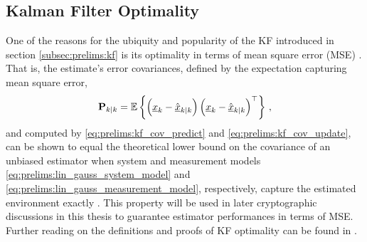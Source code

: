 \subsection{Kalman Filter Optimality}\label{subsec:prelims:kf_opt}
One of the reasons for the ubiquity and popularity of the KF introduced in section \ref{subsec:prelims:kf} is its optimality in terms of mean square error (MSE) \cite{simonOptimalStateEstimation2006,haugBayesianEstimationTracking2012,crassidisOptimalEstimationDynamic2004,chuiKalmanFilteringRealTime2013,maybeckStochasticModelsEstimation1982}. That is, the estimate's error covariances, defined by the expectation capturing mean square error,
\begin{equation}
    {\ensuremath{{\mathbf{P}}}}_{k|k} = \mathbb{E}\left\{\left({\underline{x}}_k - \hat{{\underline{x}}}_{k|k}\right)\left({\underline{x}}_k - \hat{{\underline{x}}}_{k|k}\right)^\top\right\}\,,
\end{equation}
and computed by \eqref{eq:prelims:kf_cov_predict} and \eqref{eq:prelims:kf_cov_update}, can be shown to equal the theoretical lower bound on the covariance of an unbiased estimator when system and measurement models \eqref{eq:prelims:lin_gauss_system_model} and \eqref{eq:prelims:lin_gauss_measurement_model}, respectively, capture the estimated environment exactly \cite{haugBayesianEstimationTracking2012,tichavskyPosteriorCramerRaoBounds1998}. This property will be used in later cryptographic discussions in this thesis to guarantee estimator performances in terms of MSE. Further reading on the definitions and proofs of KF optimality can be found in \cite[Chap.~6]{haugBayesianEstimationTracking2012}.

% 
% 

